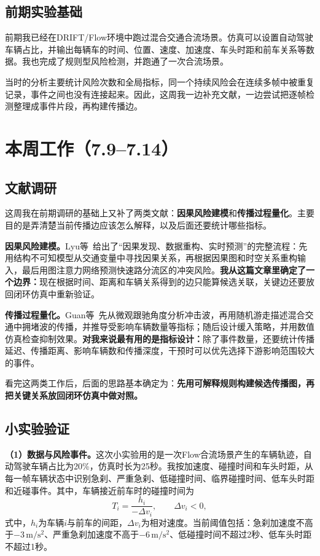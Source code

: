 \documentclass[UTF8,zihao=5,a4paper]{ctexart}
\begin{document}
\subsection{前期实验基础}

前期我已经在DRIFT/Flow环境中跑过混合交通合流场景。仿真可以设置自动驾驶车辆占比，并输出每辆车的时间、位置、速度、加速度、车头时距和前车关系等数据。我也完成了规则型风险检测，并跑通了一次合流场景。

当时的分析主要统计风险次数和全局指标，同一个持续风险会在连续多帧中被重复记录，事件之间也没有连接起来。因此，这周我一边补充文献，一边尝试把逐帧检测整理成事件片段，再构建传播边。

\section{本周工作（7.9--7.14）}

\subsection{文献调研}

这周我在前期调研的基础上又补了两类文献：\textbf{因果风险建模}和\textbf{传播过程量化}。主要目的是弄清楚当前传播边应该怎么解释，以及后面还要统计哪些指标。

\textbf{因果风险建模。}Lyu等~\cite{lyu2025causal}给出了“因果发现、数据重构、实时预测”的完整流程：先用结构不可知模型从交通变量中寻找因果关系，再根据因果图和时空关系重构输入，最后用图注意力网络预测快速路分流区的冲突风险。\textbf{我从这篇文章里确定了一个边界：}现在根据时间、距离和车辆关系得到的边只能算候选关联，关键边还要放回闭环仿真中重新验证。

\textbf{传播过程量化。}Guan等~\cite{guan2025jam}先从微观跟驰角度分析冲击波，再用随机游走描述混合交通中拥堵波的传播，并推导受影响车辆数量等指标；随后设计缓入策略，并用数值仿真检查抑制效果。\textbf{对我来说最有用的是指标设计：}除了事件数量，还要统计传播延迟、传播距离、影响车辆数和传播深度，干预时可以优先选择下游影响范围较大的事件。

看完这两类工作后，后面的思路基本确定为：\textbf{先用可解释规则构建候选传播图，再把关键关系放回闭环仿真中做对照。}

\subsection{小实验验证}

\textbf{（1）数据与风险事件。}这次小实验用的是一次Flow合流场景产生的车辆轨迹，自动驾驶车辆占比为20\%，仿真时长为25秒。我按加速度、碰撞时间和车头时距，从每一帧车辆状态中识别急刹、严重急刹、低碰撞时间、临界碰撞时间、低车头时距和近碰事件。其中，车辆接近前车时的碰撞时间为
\begin{equation}
T_i=\frac{h_i}{-\Delta v_i}, \qquad \Delta v_i<0,
\label{eq:ttc}
\end{equation}
式中，$h_i$为车辆$i$与前车的间距，$\Delta v_i$为相对速度。当前阈值包括：急刹加速度不高于$-3\,\mathrm{m/s^2}$、严重急刹加速度不高于$-6\,\mathrm{m/s^2}$、低碰撞时间不超过2秒、低车头时距不超过1秒。
\end{document}
